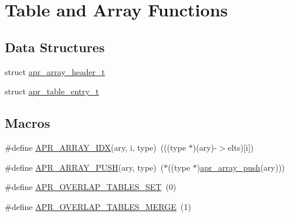 \hypertarget{group__apr__tables}{\section{Table and Array Functions}
\label{group__apr__tables}
}
\subsection*{Data Structures}
\begin{DoxyCompactItemize}
\item 
struct \hyperlink{structapr__array__header__t}{apr\-\_\-array\-\_\-header\-\_\-t}
\item 
struct \hyperlink{structapr__table__entry__t}{apr\-\_\-table\-\_\-entry\-\_\-t}
\end{DoxyCompactItemize}
\subsection*{Macros}
\begin{DoxyCompactItemize}
\item 
\#define \hyperlink{group__apr__tables_ga84066caaa4c7632671af18c229809fc4}{A\-P\-R\-\_\-\-A\-R\-R\-A\-Y\-\_\-\-I\-D\-X}(ary, i, type)~(((type $\ast$)(ary)-\/$>$elts)\mbox{[}i\mbox{]})
\item 
\#define \hyperlink{group__apr__tables_ga1833b0f940ec03d0b95926812152e1ca}{A\-P\-R\-\_\-\-A\-R\-R\-A\-Y\-\_\-\-P\-U\-S\-H}(ary, type)~($\ast$((type $\ast$)\hyperlink{group__apr__tables_gac08267b32905197dd02ffff3314d9603}{apr\-\_\-array\-\_\-push}(ary)))
\item 
\#define \hyperlink{group__apr__tables_ga867455bb7008872e03b08c0742f9698c}{A\-P\-R\-\_\-\-O\-V\-E\-R\-L\-A\-P\-\_\-\-T\-A\-B\-L\-E\-S\-\_\-\-S\-E\-T}~(0)
\item 
\#define \hyperlink{group__apr__tables_ga553eea6eb6fea4bafaf4cbd7acafdf5f}{A\-P\-R\-\_\-\-O\-V\-E\-R\-L\-A\-P\-\_\-\-T\-A\-B\-L\-E\-S\-\_\-\-M\-E\-R\-G\-E}~(1)
\end{DoxyCompactItemize}

